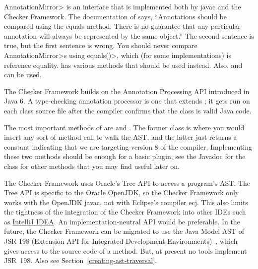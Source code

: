 \<AnnotationMirror> is an interface that is implemented both by javac and
the Checker Framework. The documentation of
 says, ``Annotations should be
compared using the equals method. There is no guarantee that any particular
annotation will always be represented by the same object.''  The second
sentence is true, but the first sentence is wrong.  You should never
compare \<AnnotationMirror>s using \<equals()>, which (for some
implementations) is reference equality.
 has various
methods that should be used instead. Also,
 and
 can be used.



The Checker Framework builds on the Annotation Processing API
introduced in Java 6.  A type-checking annotation processor is one that extends
; it gets run on each class
source file after the compiler confirms that the class is valid Java code.

The most important methods of 
are  and . The former
class is where you would insert any sort of method call to walk the AST\@,
and the latter just returns a constant indicating that we are targeting
version 8 of the compiler. Implementing these two methods should be enough
for a basic plugin; see the Javadoc for the class for other methods that
you may find useful later on.

The Checker Framework uses Oracle's Tree API to access a program's AST\@.
The Tree API is specific to the Oracle OpenJDK, so the Checker Framework only
works with the OpenJDK javac, not with Eclipse's compiler ecj.
This also limits the tightness of
the integration of the Checker Framework into other IDEs such as \href{https://www.jetbrains.com/idea/}{IntelliJ IDEA}\@.
An implementation-neutral API would be preferable.
In the future, the Checker Framework
can be migrated to use the Java Model AST of JSR 198 (Extension API for
Integrated Development Environments)~\cite{JSR198}, which gives access to
the source code of a method.  But, at present no tools
implement JSR~198.  Also see Section~\ref{creating-ast-traversal}.




